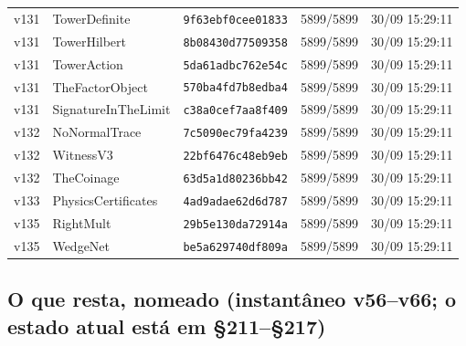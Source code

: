 \documentclass[11pt]{article}
\theoremstyle{definition}\newtheorem{deriv}{Derivação}
\begin{document}
{\begin{longtable}{@{}lllll@{}}
v131 & TowerDefinite & \texttt{9f63ebf0cee01833} & 5899/5899 & 30/09 15:29:11 \\
v131 & TowerHilbert & \texttt{8b08430d77509358} & 5899/5899 & 30/09 15:29:11 \\
v131 & TowerAction & \texttt{5da61adbc762e54c} & 5899/5899 & 30/09 15:29:11 \\
v131 & TheFactorObject & \texttt{570ba4fd7b8edba4} & 5899/5899 & 30/09 15:29:11 \\
v131 & SignatureInTheLimit & \texttt{c38a0cef7aa8f409} & 5899/5899 & 30/09 15:29:11 \\
v132 & NoNormalTrace & \texttt{7c5090ec79fa4239} & 5899/5899 & 30/09 15:29:11 \\
v132 & WitnessV3 & \texttt{22bf6476c48eb9eb} & 5899/5899 & 30/09 15:29:11 \\
v132 & TheCoinage & \texttt{63d5a1d80236bb42} & 5899/5899 & 30/09 15:29:11 \\
v133 & PhysicsCertificates & \texttt{4ad9adae62d6d787} & 5899/5899 & 30/09 15:29:11 \\
v135 & RightMult & \texttt{29b5e130da72914a} & 5899/5899 & 30/09 15:29:11 \\
v135 & WedgeNet & \texttt{be5a629740df809a} & 5899/5899 & 30/09 15:29:11 \\
\bottomrule\end{longtable}}

\subsection*{O que resta, nomeado (instantâneo v56--v66; o estado atual está em \S211--\S217)}
\end{document}
